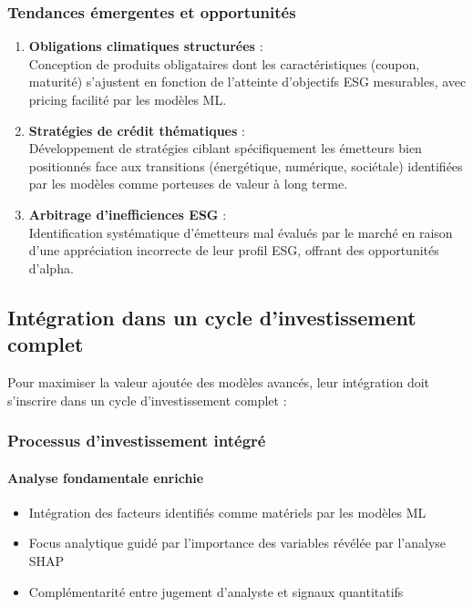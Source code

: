 \subsubsection{Tendances émergentes et opportunités}

\begin{enumerate}
  \item \textbf{Obligations climatiques structurées} :\\
  Conception de produits obligataires dont les caractéristiques (coupon, maturité) s'ajustent en fonction de l'atteinte d'objectifs ESG mesurables, avec pricing facilité par les modèles ML.

  \item \textbf{Stratégies de crédit thématiques} :\\
  Développement de stratégies ciblant spécifiquement les émetteurs bien positionnés face aux transitions (énergétique, numérique, sociétale) identifiées par les modèles comme porteuses de valeur à long terme.

  \item \textbf{Arbitrage d'inefficiences ESG} :\\
  Identification systématique d'émetteurs mal évalués par le marché en raison d'une appréciation incorrecte de leur profil ESG, offrant des opportunités d'alpha.
\end{enumerate}

\subsection{Intégration dans un cycle d'investissement complet}

Pour maximiser la valeur ajoutée des modèles avancés, leur intégration doit s'inscrire dans un cycle d'investissement complet :

\subsubsection{Processus d'investissement intégré}

\paragraph{Analyse fondamentale enrichie}
\begin{itemize}
  \item Intégration des facteurs identifiés comme matériels par les modèles ML
  \item Focus analytique guidé par l'importance des variables révélée par l'analyse SHAP
  \item Complémentarité entre jugement d'analyste et signaux quantitatifs
\end{itemize}

